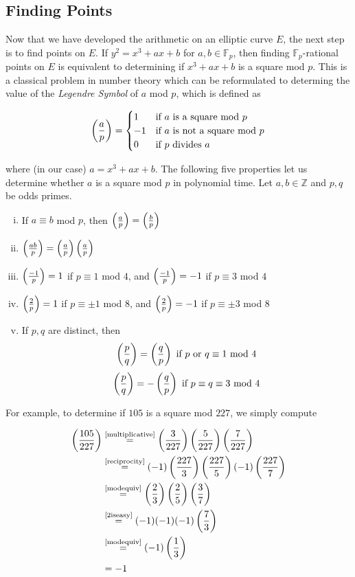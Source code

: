 \subsection{Finding Points}

Now that we have developed the arithmetic on an elliptic curve $E$, the next step is to find points on $E$. If $y^2 = x^3 + ax + b$ for $a,b \in \mathbb{F}_p$, then finding $\mathbb{F}_p$-rational points on $E$ is equivalent to determining if $x^3 + ax + b$ is a square mod $p$. This is a classical problem in number theory which can be reformulated to determing the value of the \textit{Legendre Symbol} of $a$ mod $p$, which is defined as 

$$ \left(\frac{a}{p}\right) =
\begin{cases}
1 &\text{if }a \text{ is a square mod } p\\
-1 &\text{if }a \text{ is not a square mod }p\\
0 & \text{if } p \text{ divides }a
\end{cases} 
$$ 

where (in our case) $a = x^3 + ax + b$. The following five properties let us determine whether $a$ is a square mod $p$ in polynomial time. Let $a,b \in \mathbb{Z}$ and $p,q$ be odds primes.

\begin{enumerate}[(i)]
	\item \label{modequiv} If $a \equiv b$ mod $p$, then $\left(\frac{a}{p}\right) = \left(\frac{b}{p}\right)$
	\item \label{multiplicative} $\left(\frac{ab}{p}\right) = \left(\frac{a}{p}\right) \left(\frac{a}{p}\right) $
	\item \label{1iseasy} $\left(\frac{-1}{p}\right) = 1$ if $p \equiv 1 $ mod $4$, and $\left(\frac{-1}{p}\right) = -1$ if $p \equiv 3 $ mod $4$
	\item \label{2iseasy} $\left(\frac{2}{p}\right) = 1$ if $p \equiv \pm 1 $ mod $8$, and $\left(\frac{2}{p}\right) = -1$ if $p \equiv \pm 3 $ mod $8$
	\item \label{reciprocity} If $p,q$ are distinct, then 
		$$ 
			\left(\frac{p}{q}\right) = \left(\frac{q}{p}\right) \text { if } p \text { or } q \equiv 1 \text{ mod } 4
		$$ 
		$$  
			\left(\frac{p}{q}\right) = - \left(\frac{q}{p}\right) \text { if } p \equiv q \equiv 3 \text{ mod } 4
		$$
\end{enumerate}

For example, to determine if $105$ is a square mod $227$, we simply compute 

\begin{align*}
	\left(\frac{105}{227}\right) &\stackrel{\text{\eqref{multiplicative}}}{=} \left(\frac{3}{227}\right)\left(\frac{5}{227}\right)\left(\frac{7}{227}\right) \\
	&\stackrel{\text{\eqref{reciprocity}}}{=} (-1) \left(\frac{227}{3}\right)\left(\frac{227}{5}\right) (-1) \left(\frac{227}{7}\right) \\
	&\stackrel{\text{\eqref{modequiv}}}{=} \left(\frac{2}{3}\right)\left(\frac{2}{5}\right)\left(\frac{3}{7}\right) \\
	&\stackrel{\text{\eqref{2iseasy}}}{=} (-1)(-1)(-1) \left(\frac{7}{3}\right) \\
	&\stackrel{\text{\eqref{modequiv}}}{=} (-1) \left(\frac{1}{3}\right) \\
	&= -1 
\end{align*}

